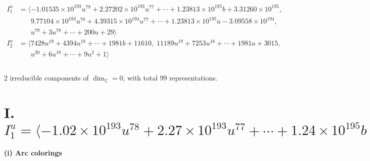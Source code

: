 \documentclass[1p]{elsarticle_modified}
\theoremstyle{definition}
\begin{document}
\begin{align*}
I^u_{1}&=\langle 
-1.01535\times10^{193} u^{78}+2.27202\times10^{193} u^{77}+\cdots+1.23813\times10^{195} b+3.31260\times10^{195},\\
\phantom{I^u_{1}}&\phantom{= \langle  }9.77104\times10^{193} u^{78}+4.39315\times10^{194} u^{77}+\cdots+1.23813\times10^{195} a-3.09558\times10^{194},\\
\phantom{I^u_{1}}&\phantom{= \langle  }u^{79}+3 u^{78}+\cdots+200 u+29\rangle \\
I^u_{2}&=\langle 
7428 u^{19}+4394 u^{18}+\cdots+1981 b+11610,\;11189 u^{19}+7253 u^{18}+\cdots+1981 a+3015,\\
\phantom{I^u_{2}}&\phantom{= \langle  }u^{20}+6 u^{18}+\cdots+9 u^2+1\rangle \\
\\
\end{align*}
\raggedright * 2 irreducible components of $\dim_{\mathbb{C}}=0$, with total 99 representations.\\
\newpage
\renewcommand{\arraystretch}{1}
\centering \section*{I. $I^u_{1}= \langle -1.02\times10^{193} u^{78}+2.27\times10^{193} u^{77}+\cdots+1.24\times10^{195} b+3.31\times10^{195},\;9.77\times10^{193} u^{78}+4.39\times10^{194} u^{77}+\cdots+1.24\times10^{195} a-3.10\times10^{194},\;u^{79}+3 u^{78}+\cdots+200 u+29 \rangle$}
\flushleft \textbf{(i) Arc colorings}\\
\end{document}
